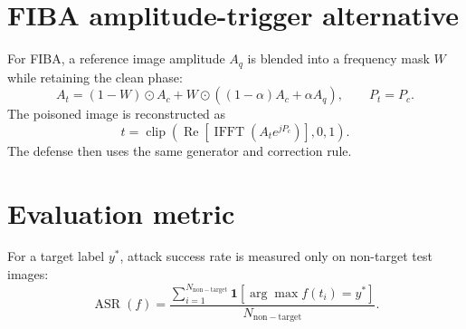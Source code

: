 \documentclass[11pt]{article}
\begin{document}
\section*{FIBA amplitude-trigger alternative}
For FIBA, a reference image amplitude $A_q$ is blended into a frequency mask
$W$ while retaining the clean phase:
\begin{equation}
    A_t=(1-W)\odot A_c+W\odot\left((1-\alpha)A_c+\alpha A_q\right),
    \qquad P_t=P_c.
\end{equation}
The poisoned image is reconstructed as
\begin{equation}
    t=\operatorname{clip}\left(\operatorname{Re}\left[
    \operatorname{IFFT}\left(A_te^{jP_c}\right)\right],0,1\right).
\end{equation}
The defense then uses the same generator and correction rule.

\section*{Evaluation metric}
For a target label $y^*$, attack success rate is measured only on non-target
test images:
\begin{equation}
    \operatorname{ASR}(f)=
    \frac{\sum_{i=1}^{N_{\mathrm{non-target}}}
    \mathbf{1}\left[\arg\max f(t_i)=y^*\right]}
    {N_{\mathrm{non-target}}}.
\end{equation}
\end{document}
